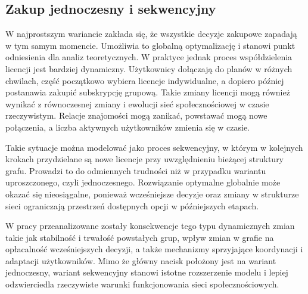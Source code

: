 



\subsection{Zakup jednoczesny i sekwencyjny}

W najprostszym wariancie zakłada się, że wszystkie decyzje zakupowe zapadają w tym samym momencie. Umożliwia to globalną optymalizację i stanowi punkt odniesienia dla analiz teoretycznych. W praktyce jednak proces współdzielenia licencji jest bardziej dynamiczny. Użytkownicy dołączają do planów w różnych chwilach, część początkowo wybiera licencje indywidualne, a dopiero później postanawia zakupić subskrypcję grupową. Takie zmiany licencji mogą również wynikać z równoczesnej zmiany i ewolucji sieć społecznościowej w czasie rzeczywistym. Relacje znajomości mogą zanikać, powstawać mogą nowe połączenia, a liczba aktywnych użytkowników zmienia się w czasie.

Takie sytuacje można modelować jako proces sekwencyjny, w którym w kolejnych krokach przydzielane są nowe licencje przy uwzględnieniu bieżącej struktury grafu. Prowadzi to do odmiennych trudności niż w przypadku wariantu uproszczonego, czyli jednoczesnego. Rozwiązanie optymalne globalnie może okazać się nieosiągalne, ponieważ wcześniejsze decyzje oraz zmiany w strukturze sieci ograniczają przestrzeń dostępnych opcji w późniejszych etapach.

W pracy przeanalizowane zostały konsekwencje tego typu dynamicznych zmian takie jak stabilność i trwałość powstałych grup, wpływ zmian w grafie na opłacalność wcześniejszych decyzji, a także mechanizmy sprzyjające koordynacji i adaptacji użytkowników. Mimo że główny nacisk położony jest na wariant jednoczesny, wariant sekwencyjny stanowi istotne rozszerzenie modelu i lepiej odzwierciedla rzeczywiste warunki funkcjonowania sieci społecznościowych.
